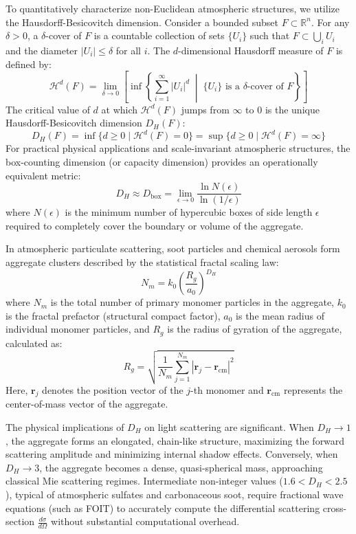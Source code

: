 \documentclass{article}
\begin{document}
To quantitatively characterize non-Euclidean atmospheric structures, we utilize the Hausdorff-Besicovitch dimension. Consider a bounded subset $F \subset \mathbb{R}^n$. For any $\delta > 0$, a $\delta$-cover of $F$ is a countable collection of sets $\{U_i\}$ such that $F \subset \bigcup_{i} U_i$ and the diameter $|U_i| \le \delta$ for all $i$. The $d$-dimensional Hausdorff measure of $F$ is defined by:
\begin{equation}
\mathcal{H}^d(F) = \lim_{\delta \to 0} \left[ \inf \left\{ \sum_{i=1}^{\infty} |U_i|^d \;\middle|\; \{U_i\} \text{ is a } \delta\text{-cover of } F \right\} \right]
\end{equation}
The critical value of $d$ at which $\mathcal{H}^d(F)$ jumps from $\infty$ to $0$ is the unique Hausdorff-Besicovitch dimension $D_H(F)$:
\begin{equation}
D_H(F) = \inf \{ d \ge 0 \mid \mathcal{H}^d(F) = 0 \} = \sup \{ d \ge 0 \mid \mathcal{H}^d(F) = \infty \}
\end{equation}
For practical physical applications and scale-invariant atmospheric structures, the box-counting dimension (or capacity dimension) provides an operationally equivalent metric:
\begin{equation}
D_H \approx D_{\text{box}} = \lim_{\epsilon \to 0} \frac{\ln N(\epsilon)}{\ln(1/\epsilon)}
\end{equation}
where $N(\epsilon)$ is the minimum number of hypercubic boxes of side length $\epsilon$ required to completely cover the boundary or volume of the aggregate.

In atmospheric particulate scattering, soot particles and chemical aerosols form aggregate clusters described by the statistical fractal scaling law:
\begin{equation}
N_m = k_0 \left( \frac{R_g}{a_0} \right)^{D_H}
\end{equation}
where $N_m$ is the total number of primary monomer particles in the aggregate, $k_0$ is the fractal prefactor (structural compact factor), $a_0$ is the mean radius of individual monomer particles, and $R_g$ is the radius of gyration of the aggregate, calculated as:
\begin{equation}
R_g = \sqrt{\frac{1}{N_m} \sum_{j=1}^{N_m} |\mathbf{r}_j - \mathbf{r}_{\text{cm}}|^2}
\end{equation}
Here, $\mathbf{r}_j$ denotes the position vector of the $j$-th monomer and $\mathbf{r}_{\text{cm}}$ represents the center-of-mass vector of the aggregate.

The physical implications of $D_H$ on light scattering are significant. When $D_H \to 1$, the aggregate forms an elongated, chain-like structure, maximizing the forward scattering amplitude and minimizing internal shadow effects. Conversely, when $D_H \to 3$, the aggregate becomes a dense, quasi-spherical mass, approaching classical Mie scattering regimes. Intermediate non-integer values ($1.6 < D_H < 2.5$), typical of atmospheric sulfates and carbonaceous soot, require fractional wave equations (such as FOIT) to accurately compute the differential scattering cross-section $\frac{d\sigma}{d\Omega}$ without substantial computational overhead.
\end{document}
